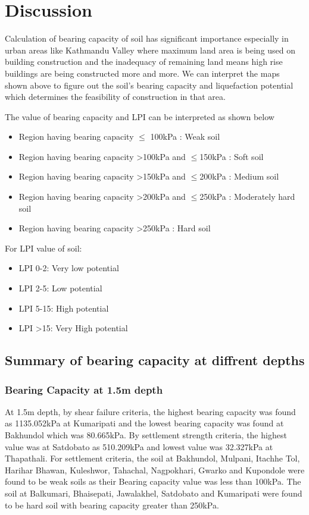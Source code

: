 \chapter{Discussion}

Calculation of bearing capacity of soil has significant importance especially in urban areas like Kathmandu Valley where maximum land area is being used on building construction and the inadequacy of remaining land means high rise buildings are being constructed more and more. We can interpret the maps shown above to figure out the soil’s bearing capacity and liquefaction potential which determines the feasibility of construction in that area. 

The value of bearing capacity and LPI can be interpreted as shown below

\begin{itemize}
\item Region having bearing capacity $\le$ 100kPa : Weak soil
\item Region having bearing capacity \textgreater 100kPa and $\le$150kPa : Soft soil
\item Region having bearing capacity \textgreater 150kPa and $\le$200kPa : Medium soil
\item Region having bearing capacity \textgreater 200kPa and $\le$250kPa : Moderately hard soil
\item Region having bearing capacity \textgreater 250kPa : Hard soil
\end{itemize}

For LPI value of soil:
\begin{itemize}
\item LPI 0-2: Very low potential
\item LPI 2-5: Low potential
\item LPI 5-15: High potential
\item LPI \textgreater 15: Very High potential
\end{itemize}

\section{Summary of bearing capacity at diffrent depths}
\subsection{Bearing Capacity at 1.5m depth}
At 1.5m depth, by shear failure criteria, the highest bearing capacity was found as 1135.052kPa at Kumaripati and the lowest bearing capacity was found at Bakhundol which was 80.665kPa. By settlement strength criteria, the highest value was at Satdobato as 510.209kPa and lowest value was 32.327kPa at Thapathali. For settlement criteria, the soil at Bakhundol, Mulpani, Itachhe Tol, Harihar Bhawan, Kuleshwor, Tahachal, Nagpokhari, Gwarko and Kupondole were found to be weak soils as their Bearing capacity value was less than 100kPa. The soil at Balkumari, Bhaisepati, Jawalakhel, Satdobato and Kumaripati were found to be hard soil with bearing capacity greater than 250kPa.

